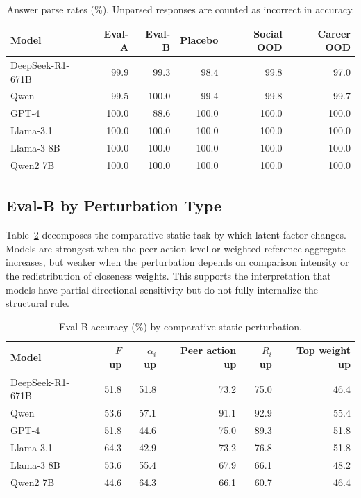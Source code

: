 \begin{table}[h]
\centering
\small
\setlength{\tabcolsep}{5pt}
\begin{tabular}{@{}lrrrrr@{}}
\toprule
\textbf{Model} & \textbf{Eval-A} & \textbf{Eval-B} & \textbf{Placebo} & \textbf{Social OOD} & \textbf{Career OOD} \\
\midrule
DeepSeek-R1-671B & 99.9 & 99.3 & 98.4 & 99.8 & 97.0 \\
Qwen & 99.5 & 100.0 & 99.4 & 99.8 & 99.7 \\
GPT-4 & 100.0 & 88.6 & 100.0 & 100.0 & 100.0 \\
Llama-3.1 & 100.0 & 100.0 & 100.0 & 100.0 & 100.0 \\
Llama-3 8B & 100.0 & 100.0 & 100.0 & 100.0 & 100.0 \\
Qwen2 7B & 100.0 & 100.0 & 100.0 & 100.0 & 100.0 \\
\bottomrule
\end{tabular}
\caption{Answer parse rates (\%). Unparsed responses are counted as incorrect in accuracy.}
\label{tab:parse_rates}
\end{table}

\subsection{Eval-B by Perturbation Type}

Table~\ref{tab:evalb_perturbations} decomposes the comparative-static task by
which latent factor changes. Models are strongest when the peer action level or
weighted reference aggregate increases, but weaker when the perturbation depends
on comparison intensity or the redistribution of closeness weights. This
supports the interpretation that models have partial directional sensitivity but
do not fully internalize the structural rule.

\begin{table}[h]
\centering
\small
\setlength{\tabcolsep}{4pt}
\begin{tabular}{@{}lrrrrr@{}}
\toprule
\textbf{Model} & \textbf{$F$ up} & \textbf{$\alpha_i$ up} & \textbf{Peer action up} & \textbf{$R_i$ up} & \textbf{Top weight up} \\
\midrule
DeepSeek-R1-671B & 51.8 & 51.8 & 73.2 & 75.0 & 46.4 \\
Qwen & 53.6 & 57.1 & 91.1 & 92.9 & 55.4 \\
GPT-4 & 51.8 & 44.6 & 75.0 & 89.3 & 51.8 \\
Llama-3.1 & 64.3 & 42.9 & 73.2 & 76.8 & 51.8 \\
Llama-3 8B & 53.6 & 55.4 & 67.9 & 66.1 & 48.2 \\
Qwen2 7B & 44.6 & 64.3 & 66.1 & 60.7 & 46.4 \\
\bottomrule
\end{tabular}
\caption{Eval-B accuracy (\%) by comparative-static perturbation.}
\label{tab:evalb_perturbations}
\end{table}

